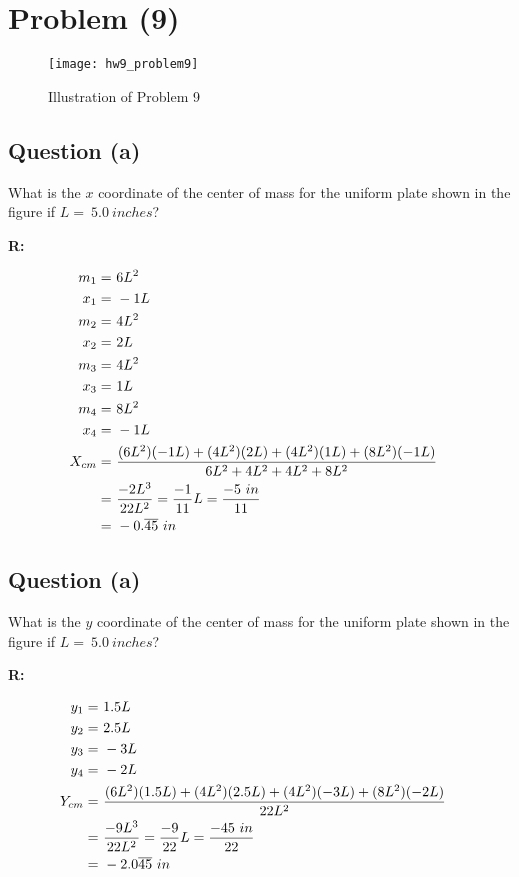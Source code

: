 \section{Problem (9)}
	\begin{figure}[H]
		\begin{center}
			\texttt{[image: hw9\_problem9]}
			\caption{Illustration of Problem 9}
			\label{fig:hw9_problem9}
		\end{center}
	\end{figure}

	\subsection{Question (a)}

		What is the $x$ coordinate of the center of mass for the uniform plate shown in the figure if $L = \ 5.0 \ inches$?

		\textbf{R:}

		\begin{align}
			m_{1} = \ &6L^{2}& \notag \\
			x_{1} = \ &-1L& \notag \\
			m_{2} = \ &4L^{2}& \notag \\
			x_{2} = \ &2L& \notag \\
			m_{3} = \ &4L^{2}& \notag \\
			x_{3} = \ &1L& \notag \\
			m_{4} = \ &8L^{2}& \notag \\
			x_{4} = \ &-1L& \notag \\
			X_{cm} = \ &\frac{(6L^{2})(-1L) + (4L^{2})(2L) + (4L^{2})(1L) + (8L^{2})(-1L)}{6L^{2} + 4L^{2} + 4L^{2} + 8L^{2}}& \notag \\
			= \ &\frac{-2 L^{3}}{22 L^{2}} = \frac{-1}{11}L = \frac{-5 \ in}{11}& \notag \\
			= \ &- 0.\overline{45} \ in&
		\end{align}

	\subsection{Question (a)}

		What is the $y$ coordinate of the center of mass for the uniform plate shown in the figure if $L = \ 5.0 \ inches$?

		\textbf{R:}

		\begin{align}
			y_{1} = \ &1.5L& \notag \\
			y_{2} = \ &2.5L& \notag \\
			y_{3} = \ &-3L& \notag \\
			y_{4} = \ &-2L& \notag \\
			Y_{cm} = \ &\frac{(6L^{2})(1.5L) + (4L^{2})(2.5L) + (4L^{2})(-3L) + (8L^{2})(-2L)}{22L^{2}}& \notag \\
			= \ &\frac{-9L^{3}}{22L^{2}} = \frac{-9}{22}L = \frac{- 45 \ in}{22}& \notag \\
			= \ &- 2.0\overline{45} \ in&
		\end{align}
